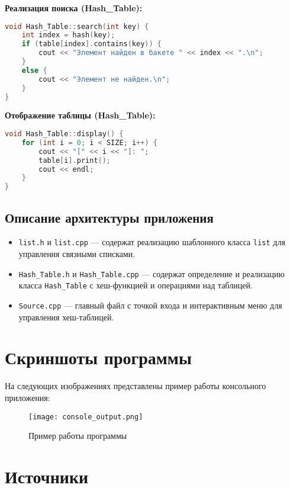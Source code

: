 \documentclass[12pt,a4paper]{scrartcl}
\begin{document}
\textbf{Реализация поиска (Hash_Table):}
\begin{lstlisting}[language=C++, caption=Метод search()]
void Hash_Table::search(int key) {
	int index = hash(key);
	if (table[index].contains(key)) {
		cout << "Элемент найден в бакете " << index << ".\n";
	}
	else {
		cout << "Элемент не найден.\n";
	}
}
\end{lstlisting}

\textbf{Отображение таблицы (Hash_Table):}
\begin{lstlisting}[language=C++, caption=Метод display()]
void Hash_Table::display() {
	for (int i = 0; i < SIZE; i++) {
		cout << "[" << i << "]: ";
		table[i].print();
		cout << endl;
	}
}
\end{lstlisting}

\subsection{Описание архитектуры приложения}

\begin{itemize}
  \item \texttt{list.h} и \texttt{list.cpp} — содержат реализацию шаблонного класса \texttt{list} для управления связными списками.
  \item \texttt{Hash_Table.h} и \texttt{Hash_Table.cpp} — содержат определение и реализацию класса \texttt{Hash_Table} с хеш-функцией и операциями над таблицей.
  \item \texttt{Source.cpp} — главный файл с точкой входа и интерактивным меню для управления хеш-таблицей.
\end{itemize}

\section{Скриншоты программы}
\label{sec:program-shots}

На следующих изображениях представлены пример работы консольного приложения:

\begin{figure}[H]
    \centering
    \texttt{[image: console\_output.png]}
    \caption{Пример работы программы}
    \label{fig:console-output}
\end{figure}

\section{Источники}
\end{document}
